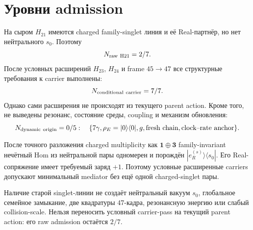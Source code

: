 \section{Уровни admission}

На сыром $H_{21}$ имеются charged family-singlet линия и её Real-партнёр,
но нет нейтрального $s_0$. Поэтому
\begin{equation}
 N_{\rm raw\ H21}=2/7.
 \label{eq:v8-mediator-existing-raw-ledger}
\end{equation}
После условных расширений $H_{23}$, $H_{24}$ и frame $45\to47$ все
структурные требования к carrier выполнены:
\begin{equation}
 N_{\rm conditional\ carrier}=7/7.
 \label{eq:v8-mediator-existing-conditional-ledger}
\end{equation}
Однако сами расширения не происходят из текущего parent action. Кроме того,
не выведены резонанс, состояние среды, coupling и механизм обновления:
\begin{equation}
 N_{\rm dynamic\ origin}=0/5:
 \quad\{7\gamma,\rho_E=|0\rangle\langle0|,g,
 \text{fresh chain},\text{clock--rate anchor}\}.
 \label{eq:v8-mediator-existing-dynamic-ledger}
\end{equation}

\begin{theorem}
После точного разложения charged multiplicity как
$\mathbf1\oplus\mathbf3$ family-invariant нечётный Hom из нейтральной пары
одномерен и порождён $|e_R^{(s)}\rangle\langle s_0|$. Его Real-сопряжение
имеет требуемый заряд $+1$. Поэтому условные расширенные carriers допускают
минимальный mediator без ещё одной charged-singlet пары.
\end{theorem}

\begin{nogocriterion}
Наличие старой singlet-линии не создаёт нейтральный вакуум $s_0$, глобальное
семейное замыкание, две квадратуры $47$-кадра, резонансную энергию или
слабый collision-scale. Нельзя переносить условный carrier-pass на текущий
parent action: его raw admission остаётся $2/7$.
\end{nogocriterion}

